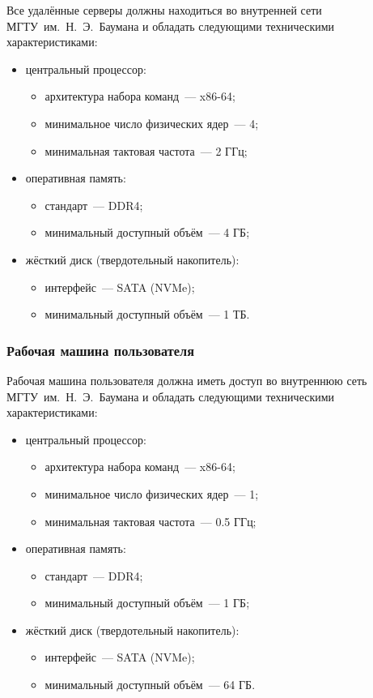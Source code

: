 \documentclass{bmstu}
\begin{document}
  Все удалённые серверы должны находиться во внутренней сети 
  \mbox{МГТУ~им.~Н.~Э.~Баумана} и обладать следующими техническими характеристиками:
  \begin{itemize}[label=---]
  	\item центральный процессор:
  	\begin{itemize}[label=---]
  		\item архитектура набора команд~--- x86-64;
  		\item минимальное число физических ядер~--- 4;
  		\item минимальная тактовая частота~--- 2 ГГц;
  	\end{itemize}
  	\item оперативная память:
  	\begin{itemize}[label=---]
  		\item стандарт~--- DDR4;
  		\item минимальный доступный объём~--- 4 ГБ;
  	\end{itemize}
  	\item жёсткий диск (твердотельный накопитель):
  	\begin{itemize}[label=---]
  		\item интерфейс~--- SATA (NVMe);
  		\item минимальный доступный объём~--- 1 ТБ.
  	\end{itemize}
  \end{itemize}

  \subsubsection{Рабочая машина пользователя}

  Рабочая машина пользователя должна иметь доступ во внутреннюю сеть
  МГТУ~им.~Н.~Э.~Баумана и обладать следующими техническими
  характеристиками:
  \begin{itemize}[label=---]
    \item центральный процессор:
      \begin{itemize}[label=---]
        \item архитектура набора команд~--- x86-64;
        \item минимальное число физических ядер~--- 1;
        \item минимальная тактовая частота~--- 0.5 ГГц;
      \end{itemize}
    \item оперативная память:
      \begin{itemize}[label=---]
        \item стандарт~--- DDR4;
        \item минимальный доступный объём~--- 1 ГБ;
      \end{itemize}
    \item жёсткий диск (твердотельный накопитель):
      \begin{itemize}[label=---]
        \item интерфейс~--- SATA (NVMe);
        \item минимальный доступный объём~--- 64 ГБ.
      \end{itemize}
  \end{itemize}
\end{document}
